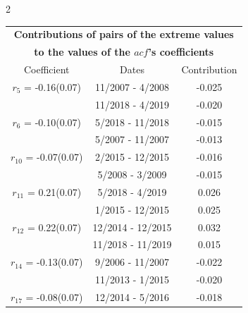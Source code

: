 
\thispagestyle{empty}
\begin{multicols}{2}{ 
\begin{tabular}{ccc}
\multicolumn{3}{c}{\textbf{Contributions of pairs of the extreme values} }  \vspace{-.10in}  \\ 
\multicolumn{3}{c}{ \textbf{to the values of the $acf$'s coefficients}} \\ 
\hline 
\hline                  Coefficient  &  Dates &  Contribution \\ 
\hline 
  $r_{ 5}$ = -0.16(0.07) &      11/2007 -  4/2008 &       -0.025    \vspace{-.10in} \\ 
  &       11/2018 -  4/2019 &       -0.020  \vspace{-.02in}   \\ \hline 
    $r_{ 6}$ = -0.10(0.07) &       5/2018 - 11/2018 &       -0.015    \vspace{-.10in} \\ 
  &        5/2007 - 11/2007 &       -0.013  \vspace{-.02in}   \\ \hline 
    $r_{10}$ = -0.07(0.07) &       2/2015 - 12/2015 &       -0.016    \vspace{-.10in} \\ 
  &        5/2008 -  3/2009 &       -0.015  \vspace{-.02in}   \\ \hline 
    $r_{11}$ = 0.21(0.07) &       5/2018 -  4/2019 &        0.026   \vspace{-.10in} \\  
&        1/2015 - 12/2015 &        0.025  \vspace{-.02in} \\ \hline 
  $r_{12}$ = 0.22(0.07) &      12/2014 - 12/2015 &        0.032   \vspace{-.10in} \\  
&       11/2018 - 11/2019 &        0.015  \vspace{-.02in} \\ \hline 
  $r_{14}$ = -0.13(0.07) &       9/2006 - 11/2007 &       -0.022    \vspace{-.10in} \\ 
  &       11/2013 -  1/2015 &       -0.020  \vspace{-.02in}   \\ \hline 
    $r_{17}$ = -0.08(0.07) &      12/2014 -  5/2016 &       -0.018    \vspace{-.10in} \\ 

\end{tabular}}
\end{multicols}
